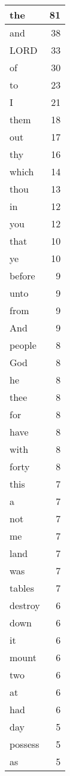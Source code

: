 \begin{center}
\begin{longtable}{l|r}
\hline \hline
\endlastfoot
the & 81 \\ \hline
and & 38 \\ \hline
LORD & 33 \\ \hline
of & 30 \\ \hline
to & 23 \\ \hline
I & 21 \\ \hline
them & 18 \\ \hline
out & 17 \\ \hline
thy & 16 \\ \hline
which & 14 \\ \hline
thou & 13 \\ \hline
in & 12 \\ \hline
you & 12 \\ \hline
that & 10 \\ \hline
ye & 10 \\ \hline
before & 9 \\ \hline
unto & 9 \\ \hline
from & 9 \\ \hline
And & 9 \\ \hline
people & 8 \\ \hline
God & 8 \\ \hline
he & 8 \\ \hline
thee & 8 \\ \hline
for & 8 \\ \hline
have & 8 \\ \hline
with & 8 \\ \hline
forty & 8 \\ \hline
this & 7 \\ \hline
a & 7 \\ \hline
not & 7 \\ \hline
me & 7 \\ \hline
land & 7 \\ \hline
was & 7 \\ \hline
tables & 7 \\ \hline
destroy & 6 \\ \hline
down & 6 \\ \hline
it & 6 \\ \hline
mount & 6 \\ \hline
two & 6 \\ \hline
at & 6 \\ \hline
had & 6 \\ \hline
day & 5 \\ \hline
possess & 5 \\ \hline
as & 5 \\ \hline

\end{longtable}
\end{center}
